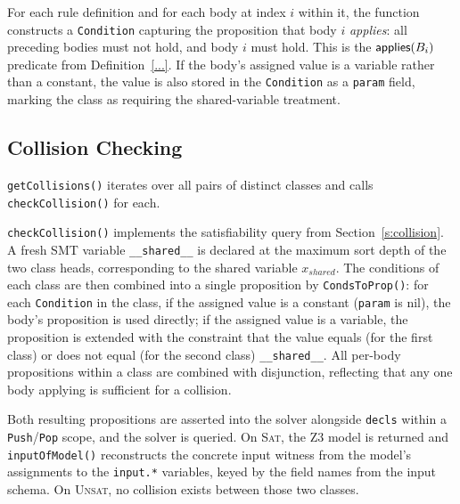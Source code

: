 For each rule definition and for each body at index $i$ within it, the function
constructs a \texttt{Condition} capturing the proposition that body $i$ \emph{applies}:
all preceding bodies must not hold, and body $i$ must hold.
This is the $\mathsf{applies}(B_i)$ predicate from Definition~\ref{...}.
If the body's assigned value is a variable rather than a constant, the value is also
stored in the \texttt{Condition} as a \texttt{param} field, marking the class as
requiring the shared-variable treatment.

\subsection{Collision Checking}
\label{ss:impl:collision:check}

\texttt{getCollisions()} iterates over all pairs of distinct classes and calls
\texttt{checkCollision()} for each.

\texttt{checkCollision()} implements the satisfiability query from
Section~\ref{s:collision}.
A fresh SMT variable \texttt{\_\_shared\_\_} is declared at the maximum sort depth of
the two class heads, corresponding to the shared variable $x_{shared}$.
The conditions of each class are then combined into a single proposition by
\texttt{CondsToProp()}: for each \texttt{Condition} in the class, if the assigned value
is a constant (\texttt{param} is nil), the body's proposition is used directly; if the
assigned value is a variable, the proposition is extended with the constraint that the
value equals (for the first class) or does not equal (for the second class)
\texttt{\_\_shared\_\_}.
All per-body propositions within a class are combined with disjunction, reflecting that
any one body applying is sufficient for a collision.

Both resulting propositions are asserted into the solver alongside \texttt{decls} within
a \texttt{Push}/\texttt{Pop} scope, and the solver is queried.
On \textsc{Sat}, the Z3 model is returned and \texttt{inputOfModel()} reconstructs the
concrete input witness from the model's assignments to the \texttt{input.*} variables,
keyed by the field names from the input schema.
On \textsc{Unsat}, no collision exists between those two classes.
